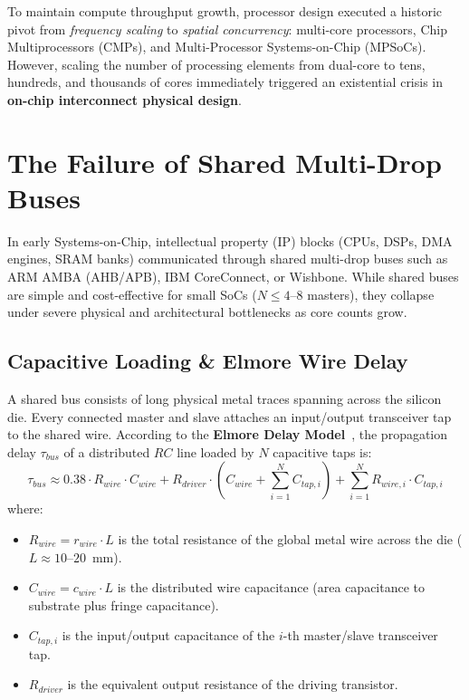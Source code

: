 To maintain compute throughput growth, processor design executed a historic pivot from \emph{frequency scaling} to \emph{spatial concurrency}: multi-core processors, Chip Multiprocessors (CMPs), and Multi-Processor Systems-on-Chip (MPSoCs). However, scaling the number of processing elements from dual-core to tens, hundreds, and thousands of cores immediately triggered an existential crisis in \textbf{on-chip interconnect physical design}.

\section{The Failure of Shared Multi-Drop Buses}
\label{sec:ch1_bus_failure}

In early Systems-on-Chip, intellectual property (IP) blocks (CPUs, DSPs, DMA engines, SRAM banks) communicated through shared multi-drop buses such as ARM AMBA (AHB/APB), IBM CoreConnect, or Wishbone. While shared buses are simple and cost-effective for small SoCs ($N \le 4$--$8$ masters), they collapse under severe physical and architectural bottlenecks as core counts grow.

\subsection{Capacitive Loading \& Elmore Wire Delay}
\label{subsec:ch1_elmore}

A shared bus consists of long physical metal traces spanning across the silicon die. Every connected master and slave attaches an input/output transceiver tap to the shared wire. According to the \textbf{Elmore Delay Model}~\cite{Elmore1948}, the propagation delay $\tau_{bus}$ of a distributed $RC$ line loaded by $N$ capacitive taps is:
\begin{equation}
\tau_{bus} \approx 0.38 \cdot R_{wire} \cdot C_{wire} + R_{driver} \cdot \left( C_{wire} + \sum_{i=1}^{N} C_{tap, i} \right) + \sum_{i=1}^{N} R_{wire, i} \cdot C_{tap, i}
\label{eq:elmore_delay}
\end{equation}
where:
\begin{itemize}
    \item $R_{wire} = r_{wire} \cdot L$ is the total resistance of the global metal wire across the die ($L \approx 10$--$20$~mm).
    \item $C_{wire} = c_{wire} \cdot L$ is the distributed wire capacitance (area capacitance to substrate plus fringe capacitance).
    \item $C_{tap, i}$ is the input/output capacitance of the $i$-th master/slave transceiver tap.
    \item $R_{driver}$ is the equivalent output resistance of the driving transistor.
\end{itemize}

